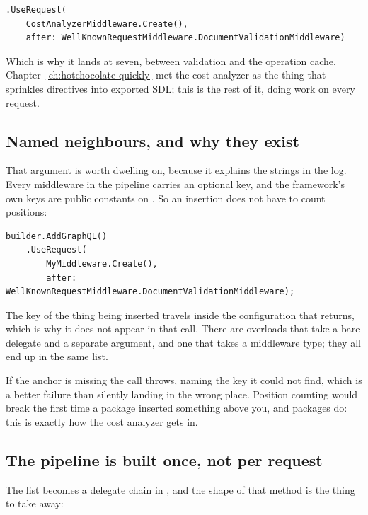 \begin{verbatim}
.UseRequest(
    CostAnalyzerMiddleware.Create(),
    after: WellKnownRequestMiddleware.DocumentValidationMiddleware)
\end{verbatim}

Which is why it lands at seven, between validation and the operation cache.
Chapter~\ref{ch:hotchocolate-quickly} met the cost analyzer as the thing that
sprinkles  directives into exported SDL; this is the rest of it,
doing work on every request.

\subsection*{Named neighbours, and why they exist}

%
That  argument is worth dwelling on, because it explains the
strings in the log. Every middleware in the pipeline carries an optional key,
and the framework's own keys are public constants on
. So an insertion does not have to count
positions:

\begin{verbatim}
builder.AddGraphQL()
    .UseRequest(
        MyMiddleware.Create(),
        after: WellKnownRequestMiddleware.DocumentValidationMiddleware);
\end{verbatim}

The key of the thing being inserted travels inside the configuration that
 returns, which is why it does not appear in that call. There are
overloads that take a bare delegate and a separate  argument, and one
that takes a middleware type; they all end up in the same list.

If the anchor is missing the call throws, naming the key it could not find,
which is a better failure than silently landing in the wrong place. Position
counting would break the first time a package inserted something above you, and
packages do: this is exactly how the cost analyzer gets in.

\subsection*{The pipeline is built once, not per request}

%
The list becomes a delegate chain in , and the shape of
that method is the thing to take away:

